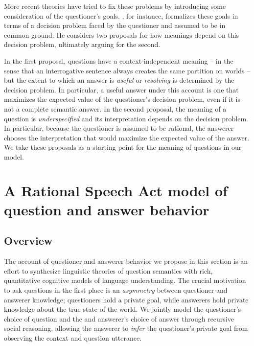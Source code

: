 \documentclass[12pt, floatsintext, jou]{apa6}
\begin{document}
More recent theories have tried to fix these problems by introducing some consideration of the questioner's goals. , for instance, formalizes these goals in terms of a decision problem faced by the questioner and assumed to be in common ground. He considers two proposals for how meanings depend on this decision problem, ultimately arguing for the second. 

In the first proposal, questions have a context-independent meaning -- in the sense that an interrogative sentence always creates the same partition on worlds -- but the extent to which an answer is \emph{useful} or \emph{resolving} is determined by the decision problem. In particular, a useful answer under this account is one that maximizes the expected value of the questioner's decision problem, even if it is not a complete semantic answer. In the second proposal, the meaning of a question is \emph{underspecified} and its interpretation depends on the decision problem. In particular, because the questioner is assumed to be rational, the answerer chooses the interpretation that would maximize the expected value of the answer. We take these proposals as a starting point for the meaning of questions in our model.

\section{A Rational Speech Act model of question and answer behavior}

\subsection{Overview}

The account of questioner and answerer behavior we propose in this section is an effort to synthesize linguistic theories of question semantics with rich, quantitative cognitive models of language understanding. The crucial motivation to ask questions in the first place is an \emph{asymmetry} between questioner and answerer knowledge; questioners hold a private goal, while answerers hold private knowledge about the true state of the world. We jointly model the questioner's choice of question and the and answerer's choice of answer through recursive social reasoning, allowing the answerer to \emph{infer} the questioner's private goal from observing the context and question utterance. 
\end{document}
